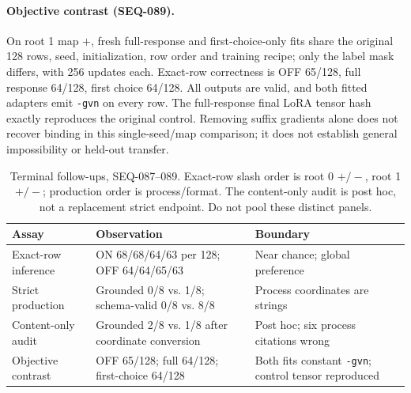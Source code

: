 \documentclass{article}
\begin{document}
\paragraph{Objective contrast (SEQ-089).} On root 1 map $+$, fresh full-response and first-choice-only fits share the original 128 rows, seed, initialization, row order and training recipe; only the label mask differs, with 256 updates each. Exact-row correctness is OFF 65/128, full response 64/128, first choice 64/128. All outputs are valid, and both fitted adapters emit \texttt{-gvn} on every row. The full-response final LoRA tensor hash exactly reproduces the original control. Removing suffix gradients alone does not recover binding in this single-seed/map comparison; it does not establish general impossibility or held-out transfer.

\begin{table}[t]
\centering\small
\caption{Terminal follow-ups, SEQ-087--089. Exact-row slash order is root 0 $+/-$, root 1 $+/-$; production order is process/format. The content-only audit is post hoc, not a replacement strict endpoint. Do not pool these distinct panels.}
\label{tab:terminalcomponents}
\begin{tabular}{@{}p{.20\linewidth}p{.39\linewidth}p{.33\linewidth}@{}}
\toprule
Assay & Observation & Boundary \\
\midrule
Exact-row inference & ON 68/68/64/63 per 128; OFF 64/64/65/63 & Near chance; global preference \\
Strict production & Grounded 0/8 vs. 1/8; schema-valid 0/8 vs. 8/8 & Process coordinates are strings \\
Content-only audit & Grounded 2/8 vs. 1/8 after coordinate conversion & Post hoc; six process citations wrong \\
Objective contrast & OFF 65/128; full 64/128; first-choice 64/128 & Both fits constant \texttt{-gvn}; control tensor reproduced \\
\bottomrule
\end{tabular}
\end{table}
\end{document}
